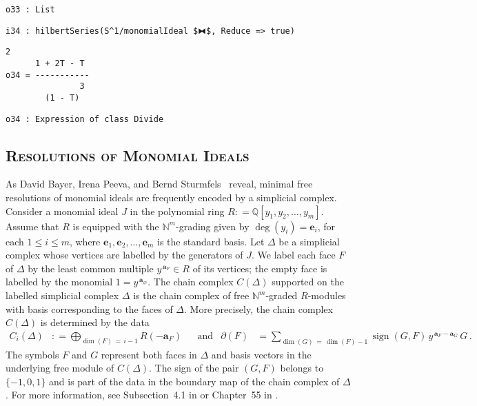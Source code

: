 \documentclass[12pt,leqno]{amsart}
\theoremstyle{definition}
\newcommand{\colequal}{\ensuremath{:\!=}}
\begin{document}
\begin{lstlisting}[xleftmargin=10pt, aboveskip=1.5pt, belowskip=1.5pt]
o33 : List
\end{lstlisting}
\begin{lstlisting}[xleftmargin=10pt, aboveskip=1.5pt, belowskip=1.5pt]
i34 : hilbertSeries(S^1/monomialIdeal $⧓$, Reduce => true)
\end{lstlisting}
\begin{lstlisting}[xleftmargin=10pt, lineskip=-10pt, aboveskip=4pt, belowskip=1pt]
                2
      1 + 2T - T
o34 = -----------
               3
        (1 - T)
\end{lstlisting}
\begin{lstlisting}[xleftmargin=10pt, aboveskip=1.5pt, belowskip=-5.0pt]
o34 : Expression of class Divide
\end{lstlisting}


\subsection*{\scshape\mdseries Resolutions of Monomial Ideals}

As David Bayer, Irena Peeva, and Bernd Sturmfels~\cite{BPS} reveal, minimal
free resolutions of monomial ideals are frequently encoded by a simplicial
complex.  Consider a monomial ideal $J$ in the polynomial ring
$R \colequal \mathbb{Q}[y_1, y_2, \dotsc, y_m]$.  Assume that $R$ is equipped
with the $\mathbb{N}^{m}$-grading given by $\deg(y_i) = \textbf{e}_i$, for each
$1 \leqslant i \leqslant m$, where
$\textbf{e}_1, \textbf{e}_2, \dotsc, \textbf{e}_m$ is the standard basis.
Let $\Delta$ be a simplicial complex whose vertices are labelled by the generators
of $J$.  We label each face $F$ of $\Delta$ by the least common multiple
$y^{\,\textbf{a}_{\!F}} \in R$ of its vertices; the empty face is labelled by
the monomial $1 = y^{\,\textbf{a}_{\!\varnothing}}$.  The chain complex
$C(\Delta)$ supported on the labelled simplicial complex $\Delta$ is the chain
complex of free $\mathbb{N}^m$-graded $R$-modules with basis corresponding to
the faces of $\Delta$. More precisely, the chain complex $C(\Delta)$ is determined
by the data
\begin{align*}
  C_i(\Delta)
  &\colequal \bigoplus_{\dim(F) \,=\, i-1} R(-\textbf{a}_F) 
  & & \text{and}
  &\partial(F)
  &= \sum_{\dim(G) \,=\, \dim(F)-1} \operatorname{sign}(G,F) \,
    y^{\,\textbf{a}_{\!F} - \textbf{a}_{\!G}} \, G \, .
\end{align*}
The symbols $F$ and $G$ represent both faces in $\Delta$ and basis vectors in
the underlying free module of $C(\Delta)$.  The sign of the pair $(G,F)$
belongs to $\{-1,0,1\}$ and is part of the data in the boundary map of the
chain complex of $\Delta$.  For more information, see Subsection~4.1 in
\cite{MS} or Chapter~55 in \cite{Peeva}.
\end{document}
